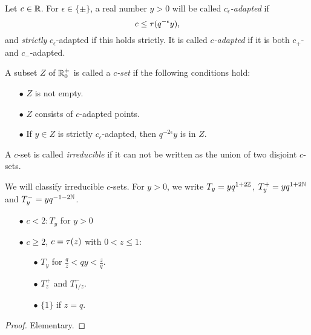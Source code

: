 \begin{Def}\label{DefAdapt} Let $c\in\mathbb{R}$. For $\epsilon \in \{\pm\}$, a real number $y>0$ will be called \emph{$c_{\epsilon}$-adapted} if \begin{equation}\label{EqAd+} c \leq \operatorname{\tau}(q^{-\epsilon}y),\end{equation} and \emph{strictly} $c_{\epsilon}$-adapted if this holds strictly. It is called \emph{$c$-adapted} if it is both $c_+$- and $c_-$-adapted. 

A subset $Z$ of $\mathbb{R}^+_0$ is called a \emph{$c$-set} if the following conditions hold: \begin{itemize} 
\item[$\bullet$] $Z$ is not empty.
\item[$\bullet$] $Z$ consists of $c$-adapted points.
\item[$\bullet$] If $y\in Z$ is strictly $c_{\epsilon}$-adapted, then $q^{-2\epsilon}y$ is in $Z$.
\end{itemize}
A $c$-set is called \emph{irreducible} if it can not be written as the union of two disjoint $c$-sets.
\end{Def}

We will classify irreducible $c$-sets. For $y>0$, we write $T_y = yq^{1+2\mathbb{Z}}$, $T_y^+ = yq^{1+2\mathbb{N}}$ and $T_y^{-} = yq^{-1-2\mathbb{N}}$. 


\begin{Prop}\label{PropClass1D}

\begin{itemize} The following list exhausts all irreducible $c$-sets.
\item[$\bullet$] $c<2: T_y$ for $y>0$
\item[$\bullet$] $c \geq 2$, $c=\operatorname{\tau}(z)$ with $0 < z\leq 1$:
\begin{itemize}
\item[$\bullet$] $T_y$ for $\frac{q}{z}<qy<\frac{z}{q}$.
\item[$\bullet$] $T_{z}^+$ and $T_{1/z}^-$.
\item[$\bullet$] $\{1\}$ if $z=q$.
\end{itemize}
\end{itemize}
\end{Prop} 
\begin{proof} Elementary.
\end{proof} 


